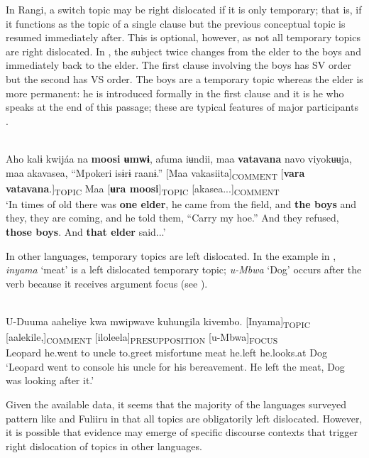 \documentclass[output=paper]{langsci/langscibook}
\begin{document}
In Rangi, a switch topic may be right dislocated if it is only temporary; that is, if it functions as the topic of a single clause but the previous conceptual topic is resumed immediately after. This is optional, however, as not all temporary topics are right dislocated. In , the subject twice changes from the elder to the boys and immediately back to the elder. The first clause involving the boys has SV order but the second has VS order. The boys are a temporary topic whereas the elder is more permanent: he is introduced formally in the first clause and it is he who speaks at the end of this passage; these are typical features of major participants \citep[119]{dooleylevinsohn2001}.

\ea\label{ex:14.nicolle}
\\
Aho kalɨ kwijáa na \textbf{moosi ʉmwɨ}, afuma iʉndii, maa \textbf{vatavana} navo viyokʉʉja, maa akavasea, “Mpokeri isɨrɨ raanɨ.” [Maa vakasiita]\textsubscript{COMMENT} [\textbf{vara vatavana}.]\textsubscript{TOPIC} Maa [\textbf{ʉra moosi}]\textsubscript{TOPIC} [akasea...]\textsubscript{COMMENT}\\
\glt ‘In times of old there was \textbf{one elder}, he came from the field, and \textbf{the boys} and they, they are coming, and he told them, “Carry my hoe.” And they refused, \textbf{those boys}. And \textbf{that elder} said...’
\z

In other languages, temporary topics are left dislocated. In the  example in ,  \textit{inyama} ‘meat’ is a left dislocated temporary topic; \textit{u}\textit{-Mbwa} ‘Dog’ occurs after the verb because it receives argument focus (see ).

\ea\label{ex:15.nicolle}
\\
\gll U-Duuma aaheliye kwa mwipwave kuhungila kivembo. [Inyama]\textsubscript{TOPIC} [aalekile,]\textsubscript{COMMENT} [iloleela]\textsubscript{PRESUPPOSITION} [u-Mbwa]\textsubscript{FOCUS} \\
Leopard he.went to uncle to.greet misfortune {\db}meat {\db}he.left {\db}he.looks.at {\db}Dog\\
\glt ‘Leopard went to console his uncle for his bereavement. He left the meat, Dog was looking after it.’
\z

Given the available data, it seems that the majority of the languages surveyed pattern like  and Fuliiru in that all topics are obligatorily left dislocated. However, it is possible that evidence may emerge of specific discourse contexts that trigger right dislocation of topics in other languages.
\end{document}
